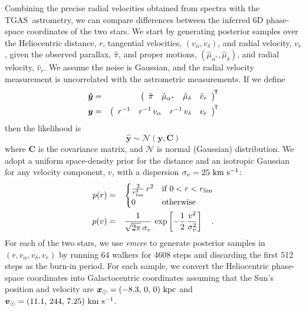 \documentclass[12pt,letterpaper,margin=1in]{article}
\newcommand{\project}[1]{\textsl{#1}}
\newcommand{\acronym}[1]{{\small{#1}}}
\newcommand{\tgas}{\acronym{TGAS}}
\newcommand{\transp}[1]{{#1}^{\!\mathsf{T}}}
\newcommand{\bs}[1]{\boldsymbol{#1}}
\newcommand{\mat}[1]{\mathbf{#1}}
\renewcommand{\vec}[1]{\bs{#1}}
\newcommand{\kms}{\ensuremath{\rm km~s^{-1}}}
\begin{document}
Combining the precise radial velocities obtained from spectra with the \tgas\
astrometry, we can compare differences between the inferred 6D phase-space
coordinates of the two stars.
We start by generating posterior samples over the Heliocentric distance, $r$,
tangential velocities, $(v_\alpha, v_\delta)$, and radial velocity, $v_r$,
given the observed parallax, $\hat\pi$, and proper motions,
$(\hat\mu_{\alpha^*}, \hat\mu_\delta)$, and radial velocity, $\hat v_r$.
We assume the noise is Gaussian, and the radial velocity measurement is
uncorrelated with the astrometric measurements.
If we define
\begin{eqnarray}
  \vec{\hat y} &=&
      \transp{\left(
        \begin{array}{c@{\hspace{1em}} c@{\hspace{1em}} c@{\hspace{1em}} c}
          \hat\pi &
          \hat\mu_{\alpha^*} &
          \hat\mu_\delta &
          \hat v_r
        \end{array}
      \right)}\\
  \vec{y} &=&
      \transp{\left(
        \begin{array}{c@{\hspace{1em}} c@{\hspace{1em}} c@{\hspace{1em}} c}
          r^{-1} &
          r^{-1}\,v_\alpha &
          r^{-1}\,v_\delta &
          v_r
        \end{array}
      \right)}
\end{eqnarray}
then the likelihood is
\begin{equation}
  \vec{\hat y} \sim \mathcal{N}(\vec{y}, \mat{C})
\end{equation} where $\mat{C}$ is the covariance matrix, and $\mathcal{N}$ is
normal (Gaussian) distribution\cite{2017AJ....153..257O}.
We adopt a uniform space-density prior for the distance and an isotropic
Gaussian for any velocity component, $v$, with a dispersion $\sigma_v=25~\kms$:
\begin{eqnarray}
p(r) &=&
  \begin{cases}
    \frac{3}{r_{\rm lim}^3} \, r^2 & \text{if } 0 < r < r_{\rm lim}\\
    0              & \text{otherwise}
  \end{cases}\\
p(v) &=& \frac{1}{\sqrt{2\pi}\,\sigma_v} \,
  \exp\left[-\frac{1}{2} \, \frac{v^2}{\sigma_v^2} \right] \quad .
\end{eqnarray}
%
For each of the two stars, we use \project{emcee}\cite{2013PASP..125..306F}
to generate posterior samples in $(r, v_\alpha, v_\delta, v_r)$
by running 64 walkers for 4608 steps and discarding the first
512 steps as the burn-in period.
For each sample, we convert the Heliocentric phase-space coordinates into
Galactocentric coordinates assuming that the Sun's position and velocity are
$\vec x_\odot = (-8.3,\,0,\,0)~{\rm kpc}$ and $\vec v_\odot =
(11.1,\,244,\,7.25)~\kms$\cite{Schonrich:2010, Schonrich:2012}.
\end{document}
